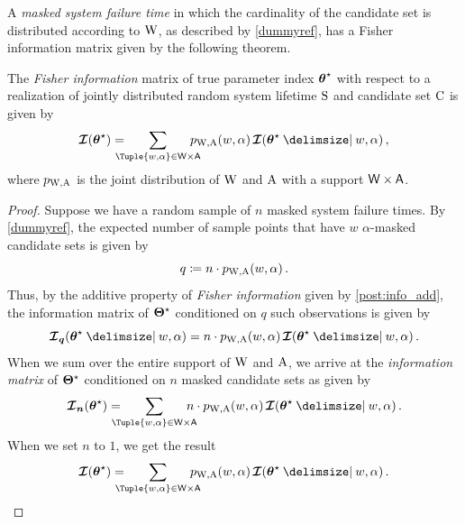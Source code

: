 \documentclass[
    11pt,
    extrafontsizes,
    article,
    oldfontcommands,
    final,
    oneside,
    openany,
    hidelinks]{memoir}
\begin{document}
A \emph{masked system failure time} in which the cardinality of the candidate set is distributed according to $\mathrm{W}$, as described by \cref{dummyref}, has 
a Fisher information matrix given by the following theorem.
\begin{theorem}
	The \emph{Fisher information} matrix of true parameter index ${\boldsymbol{\mathbf{\theta}}}^{\star}$ with respect to a realization of jointly distributed random system lifetime $\mathrm{S}$ and candidate set $\mathrm{C}$ is given by
	\begin{equation}
	\infomatrx(\tparam\sysparamvec) = \kern-1em
	\sum_{\Tuple{w,\alpha} \in \Set{W} \times \Set{A}} \kern-1em \pmf_{\RV{W},\RV{A}}(w,\alpha) \infomatrx(\tparam\sysparamvec \Given w, \alpha)\,,
	\end{equation}
	where $p_{\mathrm{W}, \mathrm{A}}$ is the joint distribution of $\mathrm{W}$ and $\mathrm{A}$ with a support $\Set{W} \times \Set{A}$.
\end{theorem}
\begin{proof}
	Suppose we have a random sample of $n$ masked system failure times.
	By \cref{dummyref}, the expected number of sample points that have $w$ $\alpha$-masked candidate sets is given by
	\begin{equation}
	q \coloneqq n \cdot p_{\mathrm{W},\mathrm{A}}(w,\alpha)\,.
	\end{equation}
	Thus, by the additive property of \emph{Fisher information} given by \cref{post:info_add}, the information matrix of ${\boldsymbol{\Theta}}^{\star}$ conditioned on $q$ such observations is given by
	\begin{equation}
	\infomatrx_{\matrx{q}}(\tparam\sysparamvec \Given w, \alpha) = n \cdot \pmf_{\RV{W},\RV{A}}(w,\alpha) \infomatrx(\tparam\sysparamvec \Given w, \alpha)\,.
	\end{equation}
	When we sum over the entire support of $\mathrm{W}$ and $\mathrm{A}$, we arrive at the \emph{information matrix} of ${\boldsymbol{\Theta}}^{\star}$ conditioned on $n$ masked candidate sets as given by
	\begin{equation}
	\infomatrx_{\matrx{n}}(\tparam\sysparamvec) = \kern-1em
	\sum_{\Tuple{w,\alpha} \in \Set{W} \times \Set{A}} \kern-1em n \cdot \pmf_{\RV{W},\RV{A}}(w,\alpha) \infomatrx(\tparam\sysparamvec \Given w, \alpha)\,.
	\end{equation}
	When we set $n$ to $1$, we get the result
	\begin{equation}
	\infomatrx(\tparam\sysparamvec) = \kern-1em
	\sum_{\Tuple{w,\alpha} \in \Set{W} \times \Set{A}} \kern-1em \pmf_{\RV{W},\RV{A}}(w,\alpha) \infomatrx(\tparam\sysparamvec \Given w, \alpha)\,.
	\end{equation}
\end{proof}
\end{document}
